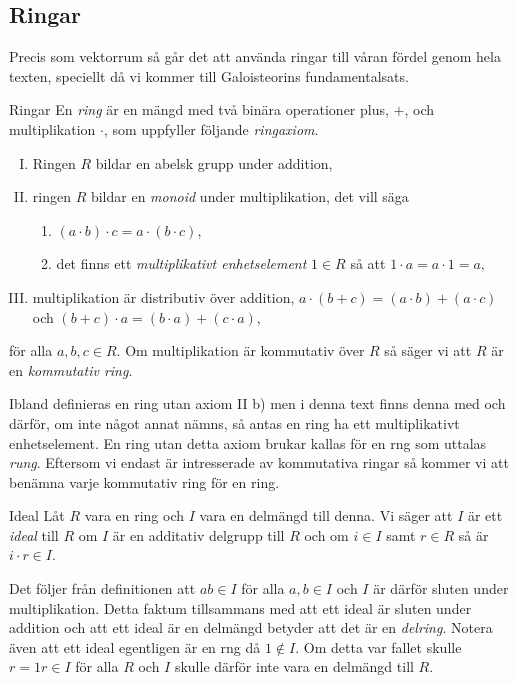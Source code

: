 \documentclass{article}
\theoremstyle{definition}
\begin{document}
\subsection{Ringar}
Precis som vektorrum så går det att använda ringar till våran fördel genom hela texten, speciellt då vi kommer till
Galoisteorins fundamentalsats.
\begin{mydef}{Ringar}{}
  En \textit{ring} är en mängd med två binära operationer plus, $+$, och multiplikation $\cdot$, som uppfyller följande \textit{ringaxiom}.
  \begin{enumerate}[I)]
    \item Ringen $R$ bildar en abelsk grupp under addition,
    \item ringen $R$ bildar en \textit{monoid} under multiplikation, det vill säga 
    \begin{enumerate}
      \item $(a \cdot b) \cdot c = a \cdot (b \cdot c)$,
      \item det finns ett \textit{multiplikativt enhetselement} $1 \in R$ så att $1 \cdot a = a \cdot 1 = a,$
    \end{enumerate}
    \item multiplikation är distributiv över addition, $a \cdot (b+c) = (a \cdot b) + (a \cdot c)$ och $(b + c) \cdot a = (b \cdot a) + (c \cdot a),$
  \end{enumerate}
  för alla $a, b, c \in R$. Om multiplikation är kommutativ över $R$ så säger vi att $R$ är en \textit{kommutativ ring}. 
\end{mydef}
Ibland definieras en ring utan axiom II b) men i denna text finns denna med och därför, om inte något annat nämns, så antas en ring ha ett multiplikativt enhetselement. 
En ring utan detta axiom brukar kallas för en rng som uttalas \textit{rung}. Eftersom vi endast är intresserade av kommutativa ringar så kommer vi 
att benämna varje kommutativ ring för en ring. 

\begin{mydef}{Ideal}{}
  Låt $R$ vara en ring och $I$ vara en delmängd till denna. Vi säger att $I$ är ett \textit{ideal} till $R$ om $I$ är en additativ delgrupp till $R$
  och om $i \in I$ samt $r \in R$ så är $i \cdot r \in I$. 
\end{mydef}
Det följer från definitionen att $ab \in I$ för alla $a, b \in I$ och $I$ är därför sluten under multiplikation. Detta faktum tillsammans 
med att ett ideal är sluten under addition och att ett ideal är en delmängd betyder att det är en \textit{delring}.
Notera även att ett ideal egentligen är en rng då $1 \notin I$. Om detta var fallet skulle 
$r = 1r \in I$ för alla $R$ och $I$ skulle därför inte vara en delmängd till $R$. 
\end{document}
